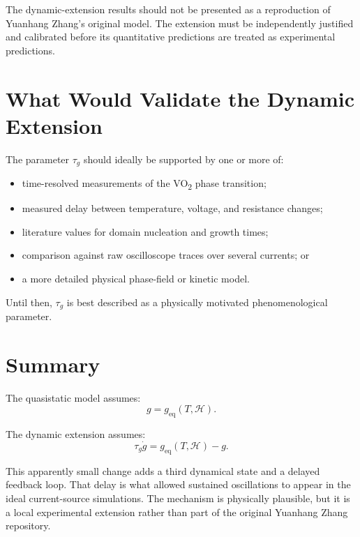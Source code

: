 \documentclass[11pt]{article}
\newcommand{\VOtwo}{VO\textsubscript{2}}
\begin{document}
The dynamic-extension results should not be presented as a reproduction of Yuanhang Zhang's original model. The extension must be independently justified and calibrated before its quantitative predictions are treated as experimental predictions.

\section{What Would Validate the Dynamic Extension}

The parameter $\tau_g$ should ideally be supported by one or more of:
\begin{itemize}
    \item time-resolved measurements of the \VOtwo{} phase transition;
    \item measured delay between temperature, voltage, and resistance changes;
    \item literature values for domain nucleation and growth times;
    \item comparison against raw oscilloscope traces over several currents; or
    \item a more detailed physical phase-field or kinetic model.
\end{itemize}

Until then, $\tau_g$ is best described as a physically motivated phenomenological parameter.

\section{Summary}

The quasistatic model assumes:
\begin{equation}
g = g_{\mathrm{eq}}(T,\mathcal{H}).
\end{equation}

The dynamic extension assumes:
\begin{equation}
\tau_g\dot g = g_{\mathrm{eq}}(T,\mathcal{H})-g.
\end{equation}

This apparently small change adds a third dynamical state and a delayed feedback loop. That delay is what allowed sustained oscillations to appear in the ideal current-source simulations. The mechanism is physically plausible, but it is a local experimental extension rather than part of the original Yuanhang Zhang repository.
\end{document}
